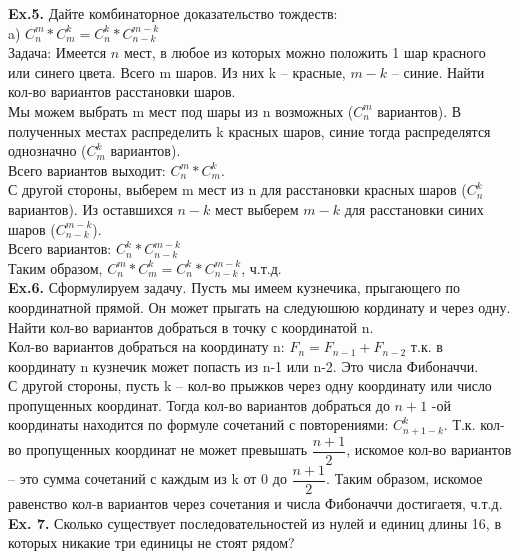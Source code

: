 \documentclass[a4paper,12pt]{article}
\begin{document}
\textbf{Ex.5.} Дайте комбинаторное доказательство тождеств:
\\

a) $ C_n^m * C_m^k = C_n^k * C_{n-k}^{m-k} $
\\
Задача: Имеется $n$ мест, в любое из которых можно положить 1 шар красного или синего цвета.  Всего m шаров. Из них k -- красные, $m-k$ -- синие. Найти кол-во вариантов расстановки шаров.
\\
Мы можем выбрать m мест под шары из n возможных ($ C_n^m $ вариантов). В полученных местах распределить k красных шаров, синие тогда распределятся однозначно ($ C_m^k $ вариантов).
\\
Всего вариантов выходит: $ C_n^m * C_m^k $.
\\
С другой стороны, выберем m мест из n для расстановки красных шаров ($ C_n^k $ вариантов). Из оставшихся $ n - k $ мест выберем $ m-k $ для расстановки синих шаров ($ C_{n-k}^{m-k} $).
\\
Всего вариантов: $ C_n^k * C_{n-k}^{m-k} $
\\
Таким образом, $ C_n^m * C_m^k = C_n^k * C_{n-k}^{m-k} $, ч.т.д.
\\

\textbf{Ex.6.} Сформулируем задачу. Пусть мы имеем кузнечика, прыгающего по координатной прямой. Он может прыгать на следуюшюю кординату и через одну. Найти кол-во вариантов добраться в точку с координатой n.
\\
Кол-во вариантов добраться на координату n: $ F_n = F_{n-1} + F_{n-2} $ т.к. в координату n кузнечик может попасть из n-1 или n-2. Это числа Фибоначчи.
\\
С другой стороны, пусть k -- кол-во прыжков через одну координату или число пропущенных координат. Тогда кол-во вариантов добраться до $n+1$ -ой координаты находится по формуле сочетаний с повторениями: $ C_{n+1-k}^k $. Т.к. кол-во пропущенных координат не может превышать $ \dfrac{n+1}{2} $, искомое кол-во вариантов -- это сумма сочетаний с каждым из k от 0 до $ \dfrac{n+1}{2} $. Таким образом, искомое равенство кол-в вариантов через сочетания и числа Фибоначчи достигаетя, ч.т.д.
\\

\textbf{Ex. 7.} Сколько существует последовательностей из нулей и единиц
длины 16, в которых никакие три единицы не стоят рядом?
\\
\end{document}
